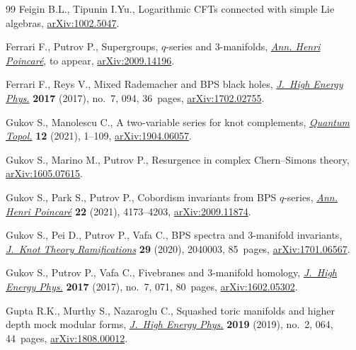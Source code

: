 \documentclass[10pt,a4paper]{amsart}
\theoremstyle{definition}
\numberwithin{equation}{section}
\begin{document}
\begin{thebibliography}{99}
Feigin B.L., Tipunin I.Yu., Logarithmic {CFT}s connected with simple {L}ie
 algebras, \href{https://arxiv.org/abs/1002.5047}{arXiv:1002.5047}.

Ferrari F., Putrov P., Supergroups, $q$-series and 3-manifolds, \href{https://doi.org/10.1007/s00023-023-01380-4}{\textit{Ann.
 Henri Poincar\'e}}, {t}o appear, \href{https://arxiv.org/abs/2009.14196}{arXiv:2009.14196}.

Ferrari F., Reys V., Mixed {R}ademacher and {BPS} black holes, \href{https://doi.org/10.1007/JHEP07(2017)094}{\textit{J.~High
 Energy Phys.}} \textbf{2017} (2017), no.~7, 094, 36~pages,
 \href{https://arxiv.org/abs/1702.02755}{arXiv:1702.02755}.

Gukov S., Manolescu C., A two-variable series for knot complements,
 \href{https://doi.org/10.4171/qt/145}{\textit{Quantum Topol.}} \textbf{12} (2021), 1--109, \href{https://arxiv.org/abs/1904.06057}{arXiv:1904.06057}.

Gukov S., Marino M., Putrov P., Resurgence in complex {C}hern--{S}imons theory,
 \href{https://arxiv.org/abs/1605.07615}{arXiv:1605.07615}.

Gukov S., Park S., Putrov P., Cobordism invariants from {BPS} {$q$}-series,
 \href{https://doi.org/10.1007/s00023-021-01089-2}{\textit{Ann. Henri Poincar\'e}} \textbf{22} (2021), 4173--4203,
 \href{https://arxiv.org/abs/2009.11874}{arXiv:2009.11874}.

Gukov S., Pei D., Putrov P., Vafa C., B{PS} spectra and 3-manifold invariants,
 \href{https://doi.org/10.1142/S0218216520400039}{\textit{J.~Knot Theory Ramifications}} \textbf{29} (2020), 2040003, 85~pages,
 \href{https://arxiv.org/abs/1701.06567}{arXiv:1701.06567}.

Gukov S., Putrov P., Vafa C., Fivebranes and 3-manifold homology,
 \href{https://doi.org/10.1007/JHEP07(2017)071}{\textit{J.~High Energy Phys.}} \textbf{2017} (2017), no.~7, 071, 80~pages,
 \href{https://arxiv.org/abs/1602.05302}{arXiv:1602.05302}.

Gupta R.K., Murthy S., Nazaroglu C., Squashed toric manifolds and higher depth
 mock modular forms, \href{https://doi.org/10.1007/jhep02(2019)064}{\textit{J.~High Energy Phys.}} \textbf{2019} (2019),
 no.~2, 064, 44~pages, \href{https://arxiv.org/abs/1808.00012}{arXiv:1808.00012}.


\end{thebibliography}
\end{document}
